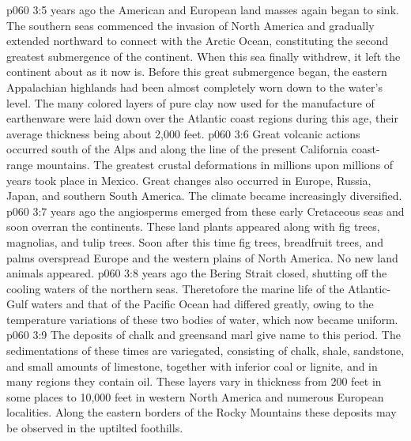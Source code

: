 \vs p060 3:5 \pc {} years ago the American and European land masses again began to sink. The southern seas commenced the invasion of North America and gradually extended northward to connect with the Arctic Ocean, constituting the second greatest submergence of the continent. When this sea finally withdrew, it left the continent about as it now is. Before this great submergence began, the eastern Appalachian highlands had been almost completely worn down to the water’s level. The many colored layers of pure clay now used for the manufacture of earthenware were laid down over the Atlantic coast regions during this age, their average thickness being about 2,000 feet.
\vs p060 3:6 Great volcanic actions occurred south of the Alps and along the line of the present California coast\hyp{}range mountains. The greatest crustal deformations in millions upon millions of years took place in Mexico. Great changes also occurred in Europe, Russia, Japan, and southern South America. The climate became increasingly diversified.
\vs p060 3:7 \pc {} years ago the angiosperms emerged from these early Cretaceous seas and soon overran the continents. These land plants  appeared along with fig trees, magnolias, and tulip trees. Soon after this time fig trees, breadfruit trees, and palms overspread Europe and the western plains of North America. No new land animals appeared.
\vs p060 3:8 \pc {} years ago the Bering Strait closed, shutting off the cooling waters of the northern seas. Theretofore the marine life of the Atlantic\hyp{}Gulf waters and that of the Pacific Ocean had differed greatly, owing to the temperature variations of these two bodies of water, which now became uniform.
\vs p060 3:9 The deposits of chalk and greensand marl give name to this period. The sedimentations of these times are variegated, consisting of chalk, shale, sandstone, and small amounts of limestone, together with inferior coal or lignite, and in many regions they contain oil. These layers vary in thickness from 200 feet in some places to 10,000 feet in western North America and numerous European localities. Along the eastern borders of the Rocky Mountains these deposits may be observed in the uptilted foothills.
